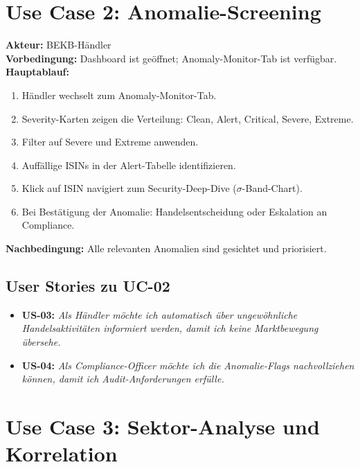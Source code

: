 \documentclass[12pt, a4paper, oneside]{report}
\begin{document}
\section{Use Case 2: Anomalie-Screening}

\begin{usecasebox}
\textbf{Akteur:} BEKB-H\"andler\\[4pt]
\textbf{Vorbedingung:} Dashboard ist ge\"offnet; Anomaly-Monitor-Tab ist verf\"ugbar.\\[4pt]
\textbf{Hauptablauf:}
\begin{enumerate}
  \item H\"andler wechselt zum Anomaly-Monitor-Tab.
  \item Severity-Karten zeigen die Verteilung: Clean, Alert, Critical, Severe, Extreme.
  \item Filter auf \glqq Severe\grqq{} und \glqq Extreme\grqq{} anwenden.
  \item Auff\"allige ISINs in der Alert-Tabelle identifizieren.
  \item Klick auf ISIN navigiert zum Security-Deep-Dive ($\sigma$-Band-Chart).
  \item Bei Best\"atigung der Anomalie: Handelsentscheidung oder Eskalation an Compliance.
\end{enumerate}
\textbf{Nachbedingung:} Alle relevanten Anomalien sind gesichtet und priorisiert.
\end{usecasebox}

\subsection{User Stories zu UC-02}

\begin{itemize}
  \item \textbf{US-03:} \textit{Als H\"andler m\"ochte ich automatisch \"uber ungew\"ohnliche Handelsaktivit\"aten informiert werden, damit ich keine Marktbewegung \"ubersehe.}
  \item \textbf{US-04:} \textit{Als Compliance-Officer m\"ochte ich die Anomalie-Flags nachvollziehen k\"onnen, damit ich Audit-Anforderungen erf\"ulle.}
\end{itemize}

\section{Use Case 3: Sektor-Analyse und Korrelation}
\end{document}
